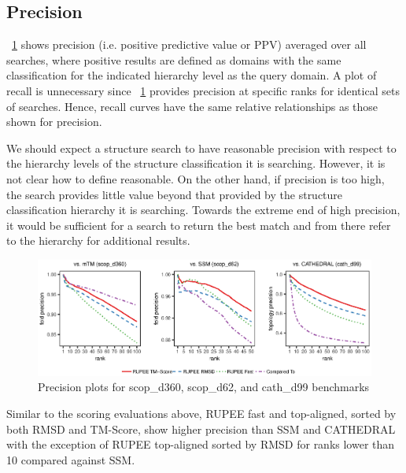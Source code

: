 \documentclass[a4,center,fleqn]{NAR}
\begin{document}
\subsection{Precision}

\figurename~\ref{fig:combined_precision} shows precision (i.e. positive predictive value or PPV) averaged over all searches, where positive results are defined as domains with the same classification for the indicated hierarchy level as the query domain. 
A plot of recall is unnecessary since \figurename~\ref{fig:combined_precision} provides precision at specific ranks for identical sets of searches. 
Hence, recall curves have the same relative relationships as those shown for precision. 

We should expect a structure search to have reasonable precision with respect to the hierarchy levels of the structure classification it is searching. 
However, it is not clear how to define reasonable. 
On the other hand, if precision is too high, the search provides little value beyond that provided by the structure classification hierarchy it is searching. 
Towards the extreme end of high precision, it would be sufficient for a search to return the best match and from there refer to the hierarchy for additional results. 

\begin{figure}[tb]
\begin{center}
\includegraphics{combined_precision}
\end{center}
\caption{Precision plots for scop\_d360, scop\_d62, and cath\_d99 benchmarks}
\label{fig:combined_precision}
\end{figure}

Similar to the scoring evaluations above, RUPEE fast and top-aligned, sorted by both RMSD and TM-Score, show higher precision than SSM and CATHEDRAL with the exception of RUPEE top-aligned sorted by RMSD for ranks lower than 10 compared against SSM. 
\end{document}
